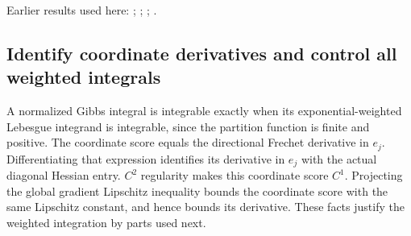 \documentclass[11pt,a4paper]{report}
\begin{document}
Earlier results used here: \cite[Section~3.26.10]{LangevinLean2026ULASC}; \cite[Section~3.26.3]{LangevinLean2026ULASC}; \cite[Section~3.26.9]{LangevinLean2026ULASC}; \cite[Section~3.27.5]{LangevinLean2026ULASC}.
\subsection{\texorpdfstring{Identify coordinate derivatives and control all weighted integrals}{Identify coordinate derivatives and control all weighted integrals}}
\label{report-step-AverageLMC-ScoreMoment-lean-3}


A normalized Gibbs integral is integrable exactly when its exponential-weighted Lebesgue integrand is integrable, since the partition function is finite and positive. The coordinate score equals the directional Frechet derivative in \(e_j\). Differentiating that expression identifies its derivative in \(e_j\) with the actual diagonal Hessian entry. \(C^{2}\) regularity makes this coordinate score \(C^{1}\). Projecting the global gradient Lipschitz inequality bounds the coordinate score with the same Lipschitz constant, and hence bounds its derivative. These facts justify the weighted integration by parts used next.
\end{document}
